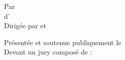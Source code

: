 \begin{center}
\bigskip \bigskip

\large{Par \auteur} \\
\medskip
\large{{\diplome} d'\discipline} \\
\medskip 
\large{Dirigée par {\directeurA} et \directeurB} \\

\bigskip\bigskip

\normalsize{Présentée et soutenue publiquement le \PhDdate} \\
\normalsize{Devant un jury composé de :} \\

\NewDocumentCommand{}
\NewDocumentCommand{}
    
\begin{table}[h!]
\centering
\small
\Comite{\juryRA}{\juryRB}{\juryEA}{\juryEB}{\juryP}{\juryDA}{\juryDB}
\end{table}
\bigskip\bigskip
\end{center}
\restoregeometry